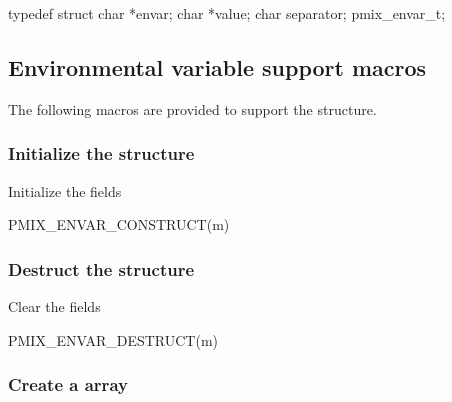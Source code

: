 \cspecificstart
\begin{codepar}
typedef struct {
    char *envar;
    char *value;
    char separator;
} pmix_envar_t;
\end{codepar}
\cspecificend


\subsection{Environmental variable support macros}

The following macros are provided to support the  structure.

\subsubsection{Initialize the  structure}

Initialize the  fields

\cspecificstart
\begin{codepar}
PMIX_ENVAR_CONSTRUCT(m)
\end{codepar}
\cspecificend

\begin{arglist}
\end{arglist}

\subsubsection{Destruct the  structure}

Clear the  fields

\cspecificstart
\begin{codepar}
PMIX_ENVAR_DESTRUCT(m)
\end{codepar}
\cspecificend

\begin{arglist}
\end{arglist}


\subsubsection{Create a  array}

